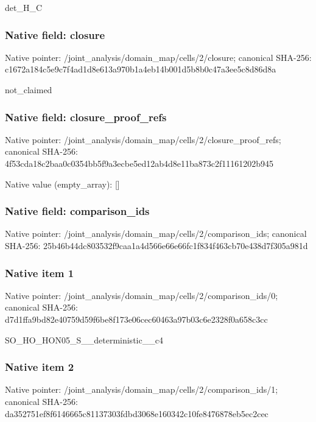 \documentclass[10pt,a4paper]{article}
\begin{document}
\begingroup\raggedright\sloppy det\_\allowbreak{}H\_\allowbreak{}C\par\endgroup

\subsubsection{Native field: closure}
Native pointer: /joint\_\allowbreak{}analysis/domain\_\allowbreak{}map/cells/2/closure; canonical SHA-256: c1672a184c5e9c7f4ad1d8e613a970b1a4eb14b001d5b8b0c47a3ee5c8d86d8a

\begingroup\raggedright\sloppy not\_\allowbreak{}claimed\par\endgroup

\subsubsection{Native field: closure\_\allowbreak{}proof\_\allowbreak{}refs}
Native pointer: /joint\_\allowbreak{}analysis/domain\_\allowbreak{}map/cells/2/closure\_\allowbreak{}proof\_\allowbreak{}refs; canonical SHA-256: 4f53cda18c2baa0c0354bb5f9a3ecbe5ed12ab4d8e11ba873c2f11161202b945

Native value (empty\_\allowbreak{}array): []

\subsubsection{Native field: comparison\_\allowbreak{}ids}
Native pointer: /joint\_\allowbreak{}analysis/domain\_\allowbreak{}map/cells/2/comparison\_\allowbreak{}ids; canonical SHA-256: 25b46b44dc803532f9caa1a4d566e66e66fc1f834f463cb70e438d7f305a981d

\subsubsection{Native item 1}
Native pointer: /joint\_\allowbreak{}analysis/domain\_\allowbreak{}map/cells/2/comparison\_\allowbreak{}ids/0; canonical SHA-256: d7d1ffa9bd82e40759d59f6be8f173e06cec60463a97b03c6e2328f0a658c3cc

\begingroup\raggedright\sloppy SO\_\allowbreak{}HO\_\allowbreak{}HON05\_\allowbreak{}S\_\allowbreak{}\_\allowbreak{}deterministic\_\allowbreak{}\_\allowbreak{}c4\par\endgroup

\subsubsection{Native item 2}
Native pointer: /joint\_\allowbreak{}analysis/domain\_\allowbreak{}map/cells/2/comparison\_\allowbreak{}ids/1; canonical SHA-256: da352751ef8f6146665c81137303fdbd3068e160342c10fe8476878eb5ec2cec
\end{document}
